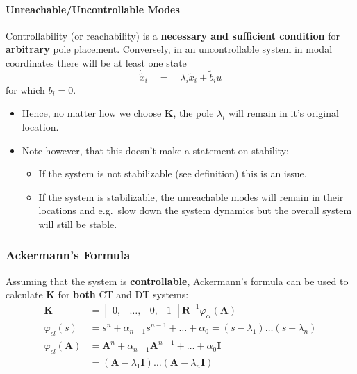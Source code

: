 \paragraph{Unreachable/Uncontrollable Modes}
Controllability (or reachability) is a \textbf{necessary and sufficient condition} for \textbf{arbitrary} pole placement.
Conversely, in an uncontrollable system in modal coordinates there will be at least one state
\begin{equation*}
    \dot{\tilde{x}}_i\quad=\quad\lambda_i\tilde{x}_i+\tilde{b}_i u
\end{equation*}
for which $b_i=0$.
\begin{itemize}
    \item Hence, no matter how we choose $\mathbf{K}$, the pole $\lambda_i$ will remain in it's original location.
    \item Note however, that this doesn't make a statement on stability:
          \begin{itemize}
              \item If the system is not stabilizable (see definition) this is an issue.
              \item If the system is stabilizable, the unreachable modes will remain in their locations and e.g.\ slow down the system dynamics but the overall system will still be stable.
          \end{itemize}
\end{itemize}

\subsubsection{Ackermann's Formula}
Assuming that the system is \textbf{controllable}, Ackermann's formula can be used to calculate $\mathbf{K}$ for \textbf{both} CT and DT systems:
\noindent\begin{align*}
    \mathbf{K}               & =\begin{bmatrix}
                                    0, & \ldots, & 0, & 1
                                \end{bmatrix}
    \mathbf{R}^{-1}\varphi_{cl}(\mathbf{A})                                                               \\
    \varphi_{cl}(s)          & =s^n+\alpha_{n-1}s^{n-1}+\ldots+\alpha_0=(s-\lambda_1)\ldots(s-\lambda_n)  \\
    \varphi_{cl}(\mathbf{A}) & =\mathbf{A}^n+\alpha_{n-1}\mathbf{A}^{n-1}+\ldots+\alpha_0 \mathbf{I}      \\
                             & = (\mathbf{A}-\lambda_1 \mathbf{I})\ldots(\mathbf{A}-\lambda_n \mathbf{I})
\end{align*}


